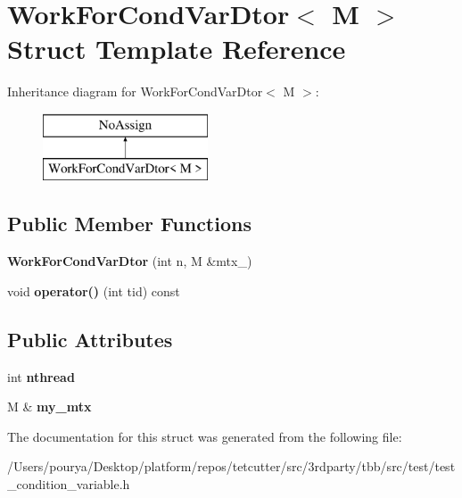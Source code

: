 \hypertarget{structWorkForCondVarDtor}{}\section{Work\+For\+Cond\+Var\+Dtor$<$ M $>$ Struct Template Reference}
\label{structWorkForCondVarDtor}
Inheritance diagram for Work\+For\+Cond\+Var\+Dtor$<$ M $>$\+:\begin{figure}[H]
\begin{center}
\leavevmode
\includegraphics[height=2.000000cm]{structWorkForCondVarDtor}
\end{center}
\end{figure}
\subsection*{Public Member Functions}
\begin{DoxyCompactItemize}
\item 
\hypertarget{structWorkForCondVarDtor_a260706c69f5777d90bf60a27f9c22c04}{}{\bfseries Work\+For\+Cond\+Var\+Dtor} (int n, M \&mtx\+\_\+)\label{structWorkForCondVarDtor_a260706c69f5777d90bf60a27f9c22c04}

\item 
\hypertarget{structWorkForCondVarDtor_a48029f229376981925421cd5866c3a98}{}void {\bfseries operator()} (int tid) const \label{structWorkForCondVarDtor_a48029f229376981925421cd5866c3a98}

\end{DoxyCompactItemize}
\subsection*{Public Attributes}
\begin{DoxyCompactItemize}
\item 
\hypertarget{structWorkForCondVarDtor_af7b102a33fb36171f0be5068825b7dac}{}int {\bfseries nthread}\label{structWorkForCondVarDtor_af7b102a33fb36171f0be5068825b7dac}

\item 
\hypertarget{structWorkForCondVarDtor_aac0db71bc6d10f4248746c6b044392a6}{}M \& {\bfseries my\+\_\+mtx}\label{structWorkForCondVarDtor_aac0db71bc6d10f4248746c6b044392a6}

\end{DoxyCompactItemize}


The documentation for this struct was generated from the following file\+:\begin{DoxyCompactItemize}
\item 
/\+Users/pourya/\+Desktop/platform/repos/tetcutter/src/3rdparty/tbb/src/test/test\+\_\+condition\+\_\+variable.\+h\end{DoxyCompactItemize}
